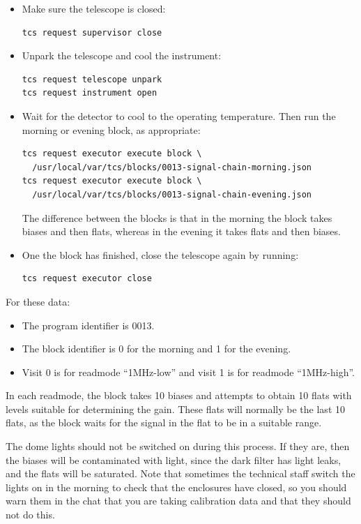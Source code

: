 \begin{itemize}
\item Make sure the telescope is closed:
\begin{verbatim}
tcs request supervisor close
\end{verbatim}
\item Unpark the telescope and cool the instrument:
\begin{verbatim}
tcs request telescope unpark
tcs request instrument open
\end{verbatim}
\item Wait for the detector to cool to the operating temperature. Then run the morning or evening block, as appropriate:
\begin{verbatim}
tcs request executor execute block \
  /usr/local/var/tcs/blocks/0013-signal-chain-morning.json
tcs request executor execute block \
  /usr/local/var/tcs/blocks/0013-signal-chain-evening.json
\end{verbatim}
The difference between the blocks is that in the morning the block takes biases and then flats, whereas in the evening it takes flats and then biases.
\item
One the block has finished, close the telescope again by running:
\begin{verbatim}
tcs request executor close
\end{verbatim}
\end{itemize}

For these data:
\begin{itemize}
\item The program identifier is 0013. 
\item The block identifier is 0 for the morning and 1 for the evening. 
\item Visit 0 is for readmode “1MHz-low” and visit 1 is for readmode “1MHz-high”.
\end{itemize}

In each readmode, the block takes 10 biases and attempts to obtain 10 flats with levels suitable for determining the gain. These flats will normally be the last 10 flats, as the block waits for the signal in the flat to be in a suitable range.

The dome lights should not be switched on during this process. If they are, then the biases will be contaminated with light, since the dark filter has light leaks, and the flats will be saturated. Note that sometimes the technical staff switch the lights on in the morning to check that the enclosures have closed, so you should warn them in the chat that you are taking calibration data and that they should not do this.

